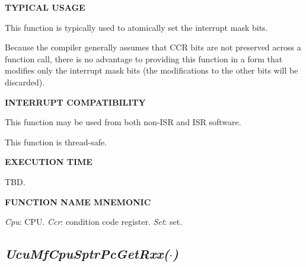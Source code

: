 \noindent\textbf{TYPICAL USAGE}
\begin{list}{}{\setlength{\leftmargin}{0.25in}\setlength{\topsep}{0.0in}}
\item This function is typically used to atomically set the interrupt mask bits.
\item Because the compiler generally assumes that CCR bits are not preserved
      across a function call, there is no advantage to providing this function
      in a form that modifies only the interrupt mask bits (the modifications
      to the other bits will be discarded).
\end{list}
\vspace{2.8ex}

\noindent\textbf{INTERRUPT COMPATIBILITY}
\begin{list}{}{\setlength{\leftmargin}{0.25in}\setlength{\topsep}{0.0in}}
\item This function may be used from both non-ISR and ISR software.
\item This function is thread-safe.
\end{list}
\vspace{2.8ex}

\noindent\textbf{EXECUTION TIME}
\begin{list}{}{\setlength{\leftmargin}{0.25in}\setlength{\topsep}{0.0in}}
\item TBD.
\end{list}
\vspace{2.8ex}

\noindent\textbf{FUNCTION NAME MNEMONIC}
\begin{list}{}{\setlength{\leftmargin}{0.25in}\setlength{\topsep}{0.0in}}
\item \emph{Cpu}: CPU.  \emph{Ccr}: condition code register.  \emph{Set}: set.
\end{list}


\subsection[\emph{UcuMfCpuSptrPcGetRxx(\protect\mbox{\protect$\cdot$})}]
           {\emph{UcuMfCpuSptrPcGetRxx(\protect\mbox{\protect\boldmath $\cdot$})}}
\label{cmsc0:scpu0:sspg0}

%

